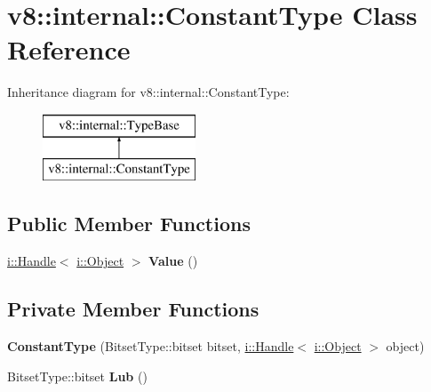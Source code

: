\hypertarget{classv8_1_1internal_1_1_constant_type}{}\section{v8\+:\+:internal\+:\+:Constant\+Type Class Reference}
\label{classv8_1_1internal_1_1_constant_type}
Inheritance diagram for v8\+:\+:internal\+:\+:Constant\+Type\+:\begin{figure}[H]
\begin{center}
\leavevmode
\includegraphics[height=2.000000cm]{classv8_1_1internal_1_1_constant_type}
\end{center}
\end{figure}
\subsection*{Public Member Functions}
\begin{DoxyCompactItemize}
\item 
\hyperlink{classv8_1_1internal_1_1_handle}{i\+::\+Handle}$<$ \hyperlink{classv8_1_1internal_1_1_object}{i\+::\+Object} $>$ {\bfseries Value} ()\hypertarget{classv8_1_1internal_1_1_constant_type_a5d2fa8a7b4e0e8695f024660b69822de}{}\label{classv8_1_1internal_1_1_constant_type_a5d2fa8a7b4e0e8695f024660b69822de}

\end{DoxyCompactItemize}
\subsection*{Private Member Functions}
\begin{DoxyCompactItemize}
\item 
{\bfseries Constant\+Type} (Bitset\+Type\+::bitset bitset, \hyperlink{classv8_1_1internal_1_1_handle}{i\+::\+Handle}$<$ \hyperlink{classv8_1_1internal_1_1_object}{i\+::\+Object} $>$ object)\hypertarget{classv8_1_1internal_1_1_constant_type_ab3fd75a2ceb667165d6aaae34880f2b9}{}\label{classv8_1_1internal_1_1_constant_type_ab3fd75a2ceb667165d6aaae34880f2b9}

\item 
Bitset\+Type\+::bitset {\bfseries Lub} ()\hypertarget{classv8_1_1internal_1_1_constant_type_af601ac8d7543c818e728ddc57a4f44da}{}\label{classv8_1_1internal_1_1_constant_type_af601ac8d7543c818e728ddc57a4f44da}

\end{DoxyCompactItemize}
